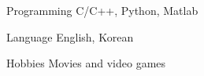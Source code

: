 
\begin{cvskills}

  \cvskill
    {Programming} %
    {C/C++, Python, Matlab} %

  \cvskill
    {Language} %
    {English, Korean} %

    \cvskill
    {Hobbies} %
    {Movies and video games} %

\end{cvskills}
